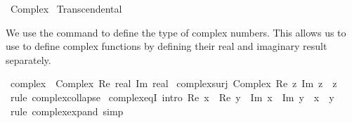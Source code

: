 %
\begin{isabellebody}%
%
%
\isadelimdocument
%
\endisadelimdocument
%
\isatagdocument
%
\isamarkuptrue%
%
\endisatagdocument
{\isafolddocument}%
%
\isadelimdocument
%
\endisadelimdocument
%
\isadelimtheory
%
\endisadelimtheory
%
\isatagtheory
{}\isamarkupfalse%
\ Complex\isanewline
{}\ Transcendental\isanewline
{}%
\endisatagtheory
{\isafoldtheory}%
%
\isadelimtheory
%
\endisadelimtheory
%
\begin{isamarkuptext}%
We use the  command to define the type of complex numbers. This
  allows us to use  to define complex functions by defining their
  real and imaginary result separately.%
\end{isamarkuptext}\isamarkuptrue%
\isamarkupfalse%
\ complex\ {\isacharequal}{\kern0pt}\ Complex\ {\isacharparenleft}{\kern0pt}Re{\isacharcolon}{\kern0pt}\ real{\isacharparenright}{\kern0pt}\ {\isacharparenleft}{\kern0pt}Im{\isacharcolon}{\kern0pt}\ real{\isacharparenright}{\kern0pt}\isanewline
\isanewline
{}\isamarkupfalse%
\ complex{\isacharunderscore}{\kern0pt}surj{\isacharcolon}{\kern0pt}\ {\isachardoublequoteopen}Complex\ {\isacharparenleft}{\kern0pt}Re\ z{\isacharparenright}{\kern0pt}\ {\isacharparenleft}{\kern0pt}Im\ z{\isacharparenright}{\kern0pt}\ {\isacharequal}{\kern0pt}\ z{\isachardoublequoteclose}\isanewline
%
\isadelimproof
\ \ %
\endisadelimproof
%
\isatagproof
{}\isamarkupfalse%
\ {\isacharparenleft}{\kern0pt}rule\ complex{\isachardot}{\kern0pt}collapse{\isacharparenright}{\kern0pt}%
\endisatagproof
{\isafoldproof}%
%
\isadelimproof
\isanewline
%
\endisadelimproof
\isanewline
{}\isamarkupfalse%
\ complex{\isacharunderscore}{\kern0pt}eqI\ {\isacharbrackleft}{\kern0pt}intro{\isacharquery}{\kern0pt}{\isacharbrackright}{\kern0pt}{\isacharcolon}{\kern0pt}\ {\isachardoublequoteopen}Re\ x\ {\isacharequal}{\kern0pt}\ Re\ y\ {\isasymLongrightarrow}\ Im\ x\ {\isacharequal}{\kern0pt}\ Im\ y\ {\isasymLongrightarrow}\ x\ {\isacharequal}{\kern0pt}\ y{\isachardoublequoteclose}\isanewline
%
\isadelimproof
\ \ %
\endisadelimproof
%
\isatagproof
{}\isamarkupfalse%
\ {\isacharparenleft}{\kern0pt}rule\ complex{\isachardot}{\kern0pt}expand{\isacharparenright}{\kern0pt}\ simp%
\endisatagproof
{\isafoldproof}%
%
\isadelimproof
\isanewline
%
\endisadelimproof
\isanewline
{}\isamarkupfalse%

\end{isabellebody}
